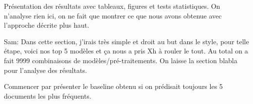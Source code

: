 Présentation des résultats avec tableaux, figures et tests statistiques.
On n'analyse rien ici, on ne fait que montrer ce que nous avons obtenue avec l'approche décrite plus haut.

Sam: Dans cette section, j'irais très simple et droit au but dans le style, pour telle étape, voici nos top 5 modèles et ça nous a pris Xh à rouler le tout.
Au total on a fait 9999 combinaisons de modèles/pré-traitements.
On laisse la section blabla pour l'analyse des résultats.

Commencer par présenter le baseline obtenu si on prédisait toujours les 5 documents les plus fréquents.